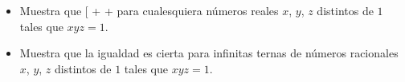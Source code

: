  \begin{itemize} 
 \item  Muestra que 
[ +  +  \]
para cualesquiera números reales $x$, $y$, $z$ distintos de $1$ tales que $xyz=1$. 
 \item  Muestra que la igualdad es cierta para infinitas ternas de números racionales $x$, $y$, $z$ distintos de $1$ tales que $xyz=1$.
 \end{itemize} 

